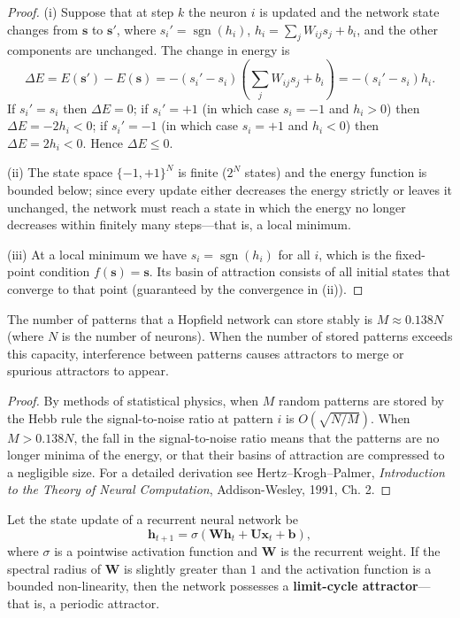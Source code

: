 \begin{proof}
(i) Suppose that at step $k$ the neuron $i$ is updated and the network state changes from $\mathbf{s}$ to $\mathbf{s}'$, where $s_i'=\operatorname{sgn}(h_i)$, $h_i=\sum_jW_{ij}s_j+b_i$, and the other components are unchanged. The change in energy is
\[
\Delta E=E(\mathbf{s}')-E(\mathbf{s})=-(s_i'-s_i)\left(\sum_jW_{ij}s_j+b_i\right)=-(s_i'-s_i)h_i.
\]
If $s_i'=s_i$ then $\Delta E=0$; if $s_i'=+1$ (in which case $s_i=-1$ and $h_i>0$) then $\Delta E=-2h_i<0$; if $s_i'=-1$ (in which case $s_i=+1$ and $h_i<0$) then $\Delta E=2h_i<0$. Hence $\Delta E\le0$.

(ii) The state space $\{-1,+1\}^N$ is finite ($2^N$ states) and the energy function is bounded below; since every update either decreases the energy strictly or leaves it unchanged, the network must reach a state in which the energy no longer decreases within finitely many steps---that is, a local minimum.

(iii) At a local minimum we have $s_i=\operatorname{sgn}(h_i)$ for all $i$, which is the fixed-point condition $f(\mathbf{s})=\mathbf{s}$. Its basin of attraction consists of all initial states that converge to that point (guaranteed by the convergence in (ii)).
\end{proof}

\begin{corollary}\label{cor:hopfield_capacity}
The number of patterns that a Hopfield network can store stably is $M\approx0.138N$ (where $N$ is the number of neurons). When the number of stored patterns exceeds this capacity, interference between patterns causes attractors to merge or spurious attractors to appear.
\end{corollary}

\begin{proof}
By methods of statistical physics, when $M$ random patterns are stored by the Hebb rule the signal-to-noise ratio at pattern $i$ is $O(\sqrt{N/M})$. When $M>0.138N$, the fall in the signal-to-noise ratio means that the patterns are no longer minima of the energy, or that their basins of attraction are compressed to a negligible size. For a detailed derivation see Hertz--Krogh--Palmer, \textit{Introduction to the Theory of Neural Computation}, Addison-Wesley, 1991, Ch. 2.
\end{proof}

\begin{theorem}\label{thm:hopfield_limit_cycle}
Let the state update of a recurrent neural network be
\[
\mathbf{h}_{t+1}=\sigma(\mathbf{W}\mathbf{h}_t+\mathbf{U}\mathbf{x}_t+\mathbf{b}),
\]
where $\sigma$ is a pointwise activation function and $\mathbf{W}$ is the recurrent weight. If the spectral radius of $\mathbf{W}$ is slightly greater than $1$ and the activation function is a bounded non-linearity, then the network possesses a \textbf{limit-cycle attractor}---that is, a periodic attractor.
\end{theorem}


